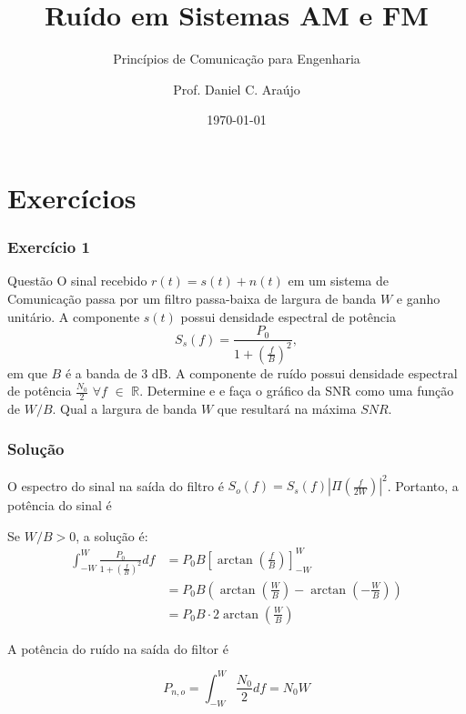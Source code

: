 \documentclass{beamer}
\title{Ruído em Sistemas AM e FM}
\subtitle{Princípios de Comunicação para Engenharia }
\author{Prof. Daniel C. Araújo}
\institute{Universidade de Brasília}
\date{\today}
\begin{document}
\frame{\titlepage}


\section{Exercícios}


\begin{frame}
  \frametitle{Exercício 1}

  \begin{block}{Questão}
    O sinal recebido $r(t) = s(t) + n(t)$ em um sistema de Comunicação
    passa por um filtro passa-baixa de largura de banda $W$ e ganho unitário.
    A componente $s(t)$ possui densidade espectral de potência
    $$
    S_s(f) = \frac{P_0}{1+\left(\frac{f}{B}\right)^2},
    $$
    em que $B$ é a banda de 3 dB. A componente de ruído possui densidade
    espectral de potência $\frac{N_0}{2}$ $\forall f$ $\in$ $\mathbb{R}$. Determine e 
    e faça o gráfico da SNR como uma função de $W/B$. Qual a largura de banda $W$ que 
    resultará na máxima $SNR$.
  \end{block}

\end{frame}

\begin{frame}
  \frametitle{Solução}

    O espectro do sinal na saída do filtro é
    $S_o(f) = S_s(f) |\Pi \left(\frac{f}{2W}\right)|^2$. Portanto, 
    a potência do sinal é 
    
    Se $W/B > 0$, a solução é:
    \begin{align*}
    \int_{-W}^{W} \frac{P_0}{1 + \left(\frac{f}{B}\right)^2} df &= P_0 B \left[\arctan\left(\frac{f}{B}\right)\right]_{-W}^{W} \\
    &= P_0 B \left(\arctan\left(\frac{W}{B}\right) - \arctan\left(-\frac{W}{B}\right)\right) \\
    &= P_0 B \cdot 2 \arctan\left(\frac{W}{B}\right)
    \end{align*}

    A potência do ruído na saída do filtor é

    $$
    P_{n,o} = \int _{-W}^{W} \frac{N_0}{2}df = N_0 W
     $$

\end{frame}
\end{document}
